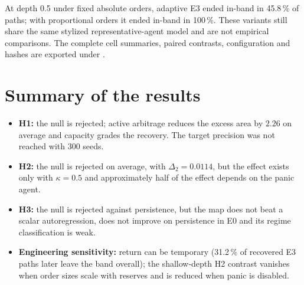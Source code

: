 At depth 0.5 under fixed absolute orders, adaptive E3 ended in-band in 45.8\,\% of paths; with proportional orders it ended in-band in 100\,\%. These variants still share the same stylized representative-agent model and are not empirical comparisons. The complete cell summaries, paired contrasts, configuration and hashes are exported under .

\section{Summary of the results}

\begin{itemize}
  \item \textbf{H1:} the null is rejected; active arbitrage reduces the excess area by $2.26$ on average and capacity grades the recovery. The target precision was not reached with 300 seeds.
  \item \textbf{H2:} the null is rejected on average, with $\Delta_2=0.0114$, but the effect exists only with $\kappa=0.5$ and approximately half of the effect depends on the panic agent.
  \item \textbf{H3:} the null is rejected against persistence, but the map does not beat a scalar autoregression, does not improve on persistence in E0 and its regime classification is weak.
  \item \textbf{Engineering sensitivity:} return can be temporary (31.2\,\% of recovered E3 paths later leave the band overall); the shallow-depth H2 contrast vanishes when order sizes scale with reserves and is reduced when panic is disabled.
\end{itemize}
